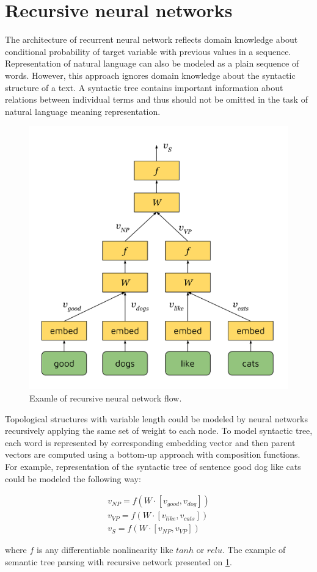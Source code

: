 \section{Recursive neural networks}
The architecture of recurrent neural network reflects domain knowledge about conditional probability of target variable with previous values in a sequence. Representation of natural language can also be modeled as a plain sequence of words. However, this approach ignores domain knowledge about the syntactic structure of a text. A syntactic tree contains important information about relations between individual terms and thus should not be omitted in the task of natural language meaning representation.

\begin{figure}
\centering
\includegraphics{Figures/rvnn}
\decoRule
\caption[RvNN flow]{Examle of recursive neural network flow.}
\label{fig:rvnn}
\end{figure}

Topological structures with variable length could be modeled by neural networks recursively applying the same set of weight to each node. To model syntactic tree, each word is represented by corresponding embedding vector and then parent vectors are computed using a bottom-up approach with composition functions. For example, representation of the syntactic tree of sentence good dog like cats could be modeled the following way:

\begin{equation}
\begin{split}
v_{NP} = f(W\cdot[v_{good}, v_{dog}])\\
v_{VP} = f(W\cdot[v_{like}, v_{cats}])\\
v_S = f(W\cdot[v_{NP}, v_{VP}])
\label{attn:rvnn_example}
\end{split}
\end{equation}

where $f$ is any differentiable nonlinearity like $tanh$ or $relu$. The example of semantic tree parsing with recursive network presented on \ref{fig:rvnn}. 
